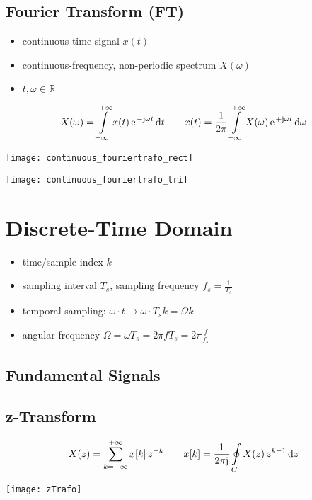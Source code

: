 \documentclass[landscape,columns=3]{cheatsheet} %
\begin{document}
\subsection{Fourier Transform (FT)}
%
%
\begin{itemize}
\setlength\itemsep{-0.5em}
\item continuous-time signal $x(t)$
%
\item continuous-frequency, non-periodic spectrum $X(\omega)$
%
\item $t, \omega\in\mathbb{R}$
%
\end{itemize}
%
\begin{align*}
X(\omega) = \int\limits_{-\infty}^{+\infty} x(t) \,\e^{-\im \omega t}\,\mathrm{d}t
\qquad
x(t) = \frac{1}{2\pi}\int\limits_{-\infty}^{+\infty} X(\omega) \,\e^{+\im \omega t}\,\mathrm{d}\omega
\end{align*}
\begin{minipage}{\columnwidth}
\texttt{[image: continuous\_fouriertrafo\_rect]}
\end{minipage}

\begin{minipage}{\columnwidth}
	\texttt{[image: continuous\_fouriertrafo\_tri]}
\end{minipage}




\columnbreak
\section{Discrete-Time Domain}
%
\begin{itemize}
\setlength\itemsep{-0.5em}
%
\item time/sample index $k$
%
\item sampling interval $T_s$, sampling frequency $f_s = \frac{1}{T_s}$
%
\item temporal sampling: $\omega \cdot t \rightarrow \omega \cdot T_s k = \Omega k$
%
\item angular frequency $\Omega = \omega T_s = 2 \pi f T_s = 2 \pi \frac{f}{f_s}$
%
\end{itemize}


\subsection{Fundamental Signals}

\subsection{z-Transform}
%
\begin{align*}
X(z) = \sum\limits_{k=-\infty}^{+\infty} x[k] \,z^{-k}
\qquad
x[k] = \frac{1}{2\pi\im}\oint\limits_{C}^{} X(z) \,z^{k-1}\,\mathrm{d}z
\end{align*}
\begin{minipage}{\columnwidth}
	\texttt{[image: zTrafo]}
\end{minipage}
\columnbreak
\end{document}
